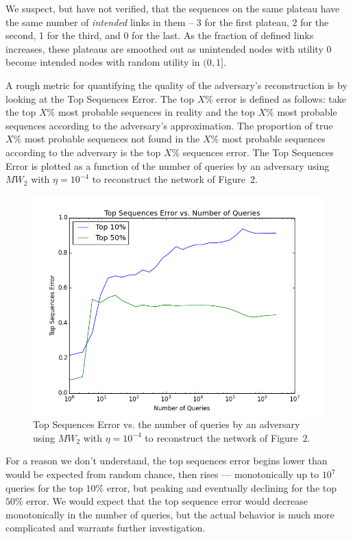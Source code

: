 \documentclass[preprint2]{aastex}
\begin{document}
\newpage

We suspect, but have not verified, that the sequences on the same plateau have the same number of \emph{intended} links in them -- 3 for the first plateau, 2 for the second, 1 for the third, and 0 for the last. As the fraction of defined links increases, these plateaus are smoothed out as unintended nodes with utility 0 become intended nodes with random utility in \((0, 1]\).

A rough metric for quantifying the quality of the adversary's reconstruction is by looking at the Top Sequences Error. The top \(X\%\) error is defined as follows: take the top \(X\%\) most probable sequences in reality and the top \(X\%\) most probable sequences according to the adversary's approximation. The proportion of true \(X\%\) most probable sequences not found in the \(X\%\) most probable sequences according to the adversary is the top \(X\%\) sequences error. The Top Sequences Error is plotted as a function of the number of queries by an adversary using \(MW_2\) with \(\eta = 10^{-4}\) to reconstruct the network of Figure~2.

\begin{figure}[H]
\vspace{-0.24cm}
\centering
\hspace*{-0.5cm}\includegraphics[width=1.2 	\textwidth]{top_seq_err.png}
\caption{Top Sequences Error vs. the number of queries by an adversary using \(MW_2\) with \(\eta = 10^{-4}\) to reconstruct the network of Figure~2.}
\end{figure}

For a reason we don't understand, the top sequences error begins lower than would be expected from random chance, then rises --- monotonically up to \(10^7\) queries for the top \(10\%\) error, but peaking and eventually declining for the top \(50\%\) error. We would expect that the top sequence error would decrease monotonically in the number of queries, but the actual behavior is much more complicated and warrants further investigation. 
\end{document}
